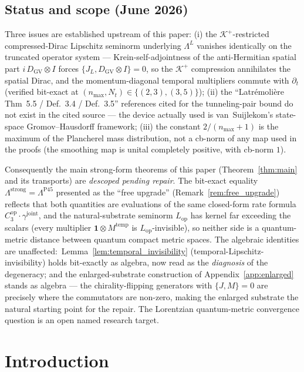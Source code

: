 \documentclass[11pt,a4paper]{article}
\theoremstyle{plain}
\theoremstyle{definition}
\newcommand{\nmax}{n_{\max}}
\newcommand{\Nt}{N_{t}}
\newcommand{\Krein}{\mathcal{K}}
\newcommand{\DGV}{D_{\mathrm{GV}}}
\newcommand{\JL}{J_{L}}
\newcommand{\Lprop}{\Lambda^{\mathrm{strong}}}
\newcommand{\Lpropweak}{\Lambda^{L}}
\newcommand{\Lop}{L_{\mathrm{op}}}
\newcommand{\gammajoint}{\gamma^{\mathrm{joint}}}
\newcommand{\Cthreeop}{C_{3}^{\mathrm{op}}}
\newcommand{\Kplus}{\Krein^{+}}
\newcommand{\temp}{\mathrm{temp}}
\begin{document}
\subsection*{Status and scope (June 2026)}
Three issues are established upstream of this paper: (i) the
$\Kplus$-restricted compressed-Dirac Lipschitz seminorm underlying
$\Lpropweak$ vanishes identically on the truncated operator system
--- Krein-self-adjointness of the anti-Hermitian spatial part
$i\,\DGV \otimes I$ forces $\{\JL, \DGV \otimes I\} = 0$, so the
$\Kplus$ compression annihilates the spatial Dirac, and the
momentum-diagonal temporal multipliers commute with $\partial_t$
(verified bit-exact at $(\nmax, \Nt) \in \{(2,3), (3,5)\}$); (ii)
the ``Latr\'emoli\`ere Thm~5.5 / Def.~3.4 / Def.~3.5'' references
cited for the tunneling-pair bound do not exist in the cited source
--- the device actually used is van~Suijlekom's state-space
Gromov--Hausdorff framework; (iii) the constant $2/(\nmax + 1)$ is
the maximum of the Plancherel mass distribution, not a cb-norm of
any map used in the proofs (the smoothing map is unital completely
positive, with cb-norm $1$).

Consequently the main strong-form theorems of this paper
(Theorem~\ref{thm:main} and its transports) are \emph{descoped
pending repair}. The bit-exact equality
$\Lprop = \Lambda^{\mathrm{P45}}$ presented as the ``free upgrade''
(Remark~\ref{rem:free_upgrade}) reflects that both quantities are
evaluations of the same closed-form rate formula $\Cthreeop \cdot
\gammajoint$, and the natural-substrate seminorm $\Lop$ has kernel
far exceeding the scalars (every multiplier $\mathbf{1} \otimes
M^{\temp}$ is $\Lop$-invisible), so neither side is a quantum-metric
distance between quantum compact metric spaces. The algebraic
identities are unaffected:\ Lemma~\ref{lem:temporal_invisibility}
(temporal-Lipschitz-invisibility) holds bit-exactly as algebra, now
read as the \emph{diagnosis} of the degeneracy; and the
enlarged-substrate construction of Appendix~\ref{app:enlarged} stands
as algebra --- the chirality-flipping generators with $\{J, M\} = 0$
are precisely where the commutators are non-zero, making the enlarged
substrate the natural starting point for the repair. The Lorentzian
quantum-metric convergence question is an open named research target.

\section{Introduction}\label{sec:intro}
\end{document}
